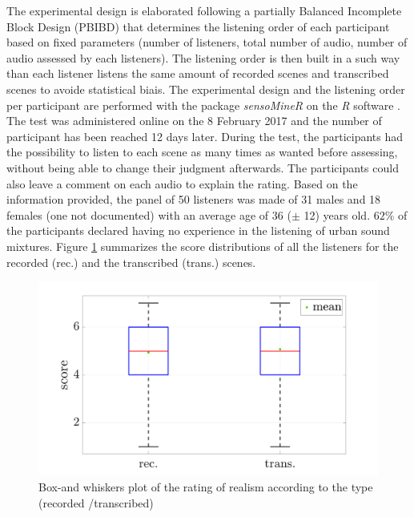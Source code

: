 \documentclass[review,5p,twocolumn,sort&compress,times]{elsarticle}
\begin{document}
The experimental design is elaborated following a partially Balanced Incomplete Block Design (PBIBD) \cite{john1977optimal} that determines the listening order of each participant based on fixed parameters (number of listeners, total number of audio, number of audio assessed by each listeners). The listening order is then built in a such way than each listener listens the same amount of recorded scenes and transcribed scenes to avoide statistical biais. The experimental design and the listening order per participant are performed with the package \textit{sensoMineR} on the \textit{R} software \cite{le_sensominer:_2008}.\\

The test was administered online on the 8 February 2017 and the number of participant has been reached 12 days later. During the test, the participants had the possibility to listen to each scene as many times as wanted before assessing, without being able to change their judgment afterwards. The participants could also leave a comment on each audio to explain the rating. Based on the information provided, the panel of 50 listeners was made of 31 males and 18 females (one not documented) with an average age of 36 ($\pm$ 12) years old. $62\%$ of the participants declared having no experience in the listening of urban sound mixtures. Figure \ref{fig:boxPlot_test} summarizes the score distributions of all the listeners for the recorded (rec.) and the transcribed (trans.) scenes. 

\begin{figure}[t]
\centering
\includegraphics[width=\linewidth]{figures/testPerceptif_boxplotType_EN.pdf} 
\caption{Box-and whiskers plot of the rating of realism according to the type (recorded /transcribed)}
\label{fig:boxPlot_test}
\end{figure}
\end{document}
